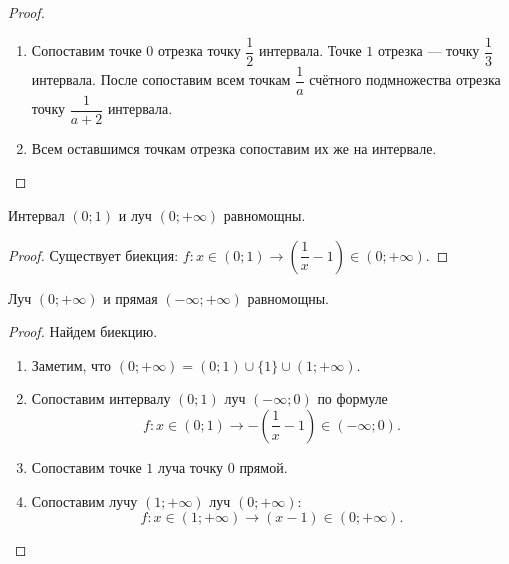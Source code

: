 \documentclass[a4paper]{article}
\theoremstyle{named}
\begin{document}
\begin{colloq}
\begin{proof}
\begin{enumerate}
                \item
                    Сопоставим точке $0$ отрезка точку $\dfrac{1}{2}$ интервала. Точке $1$ отрезка --- точку $\dfrac{1}{3}$ интервала. После сопоставим всем точкам $\dfrac{1}{a}$ счётного подмножества отрезка точку $\dfrac{1}{a + 2}$ интервала.

                \item
                    Всем оставшимся точкам отрезка сопоставим их же на интервале.
            \end{enumerate}
        \end{proof}

        \begin{theorem*}
            Интервал $(0; 1)$ и луч $(0; +\infty)$ равномощны.
        \end{theorem*}

        \begin{proof}
            Существует биекция: $f: x \in (0; 1) \to \left(\dfrac{1}{x} - 1\right) \in (0; +\infty)$.
        \end{proof}

        \begin{theorem*}
            Луч $(0; +\infty)$ и прямая $(-\infty; +\infty)$ равномощны.
        \end{theorem*}

        \begin{proof}
            Найдем биекцию.
            \begin{enumerate}
            \item
                Заметим, что $(0; +\infty) = (0; 1) \cup \{1\} \cup (1; +\infty)$.

            \item
                Сопоставим интервалу $(0; 1)$ луч $(-\infty; 0)$ по формуле
                \begin{equation*}
                    f: x \in (0; 1) \to -\left(\dfrac{1}{x} - 1\right) \in (-\infty; 0).
                \end{equation*}

            \item
                Сопоставим точке $1$ луча точку $0$ прямой.

            \item
                Сопоставим лучу $(1; +\infty)$ луч $(0; +\infty)$:
                \begin{equation*}
                    f: x \in (1; +\infty) \to (x - 1) \in (0; +\infty).
                \end{equation*}
            \end{enumerate}
        \end{proof}


\end{colloq}
\end{document}

